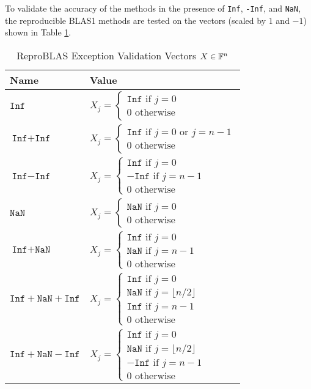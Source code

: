  To validate the accuracy of the methods in the presence of \texttt{Inf}, \texttt{-Inf}, and \texttt{NaN}, the reproducible BLAS1 methods are tested on the vectors (scaled by $1$ and $-1$) shown in Table \ref{tbl:validateinfblas1data}.
    \begin{table}[!htbp]
        \centering
        \begin{tabular}{ | l |  l |} \hline
            Name & Value\\ \hline
            $\texttt{Inf}$ & $X_j = \begin{cases} \texttt{Inf} \text{ if } j = 0 \\ 0 \text{ otherwise} \end{cases}$ \\ \hline
            $\texttt{Inf} + \texttt{Inf}$ & $X_j = \begin{cases} \texttt{Inf} \text{ if } j = 0 \text{ or } j = n - 1 \\ 0 \text{ otherwise} \end{cases}$\\ \hline
            $\texttt{Inf} - \texttt{Inf}$ & $X_j = \begin{cases} \texttt{Inf} \text{ if } j = 0 \\ -\texttt{Inf} \text{ if } j = n - 1 \\ 0 \text{ otherwise} \end{cases}$\\ \hline
            $\texttt{NaN}$ & $X_j = \begin{cases} \texttt{NaN} \text{ if } j = 0 \\ 0 \text{ otherwise} \end{cases}$\\ \hline
            $\texttt{Inf} + \texttt{NaN}$ & $X_j = \begin{cases} \texttt{Inf} \text{ if } j = 0 \\ \texttt{NaN} \text{ if } j = n - 1 \\ 0 \text{ otherwise} \end{cases}$\\ \hline
            $\texttt{Inf} + \texttt{NaN} + \texttt{Inf}$ & $X_j = \begin{cases} \texttt{Inf} \text{ if } j = 0 \\ \texttt{NaN} \text{ if } j = \lfloor n/2 \rfloor \\ \texttt{Inf} \text{ if } j = n - 1 \\ 0 \text{ otherwise} \end{cases}$\\ \hline
            $\texttt{Inf} + \texttt{NaN} - \texttt{Inf}$ & $X_j = \begin{cases} \texttt{Inf} \text{ if } j = 0 \\ \texttt{NaN} \text{ if } j = \lfloor n/2 \rfloor \\ -\texttt{Inf} \text{ if } j = n - 1 \\ 0 \text{ otherwise} \end{cases}$\\ \hline
        \end{tabular}
        \caption{ReproBLAS Exception Validation Vectors $X \in \mathbb{F}^n$}
        \label{tbl:validateinfblas1data}
    \end{table}

